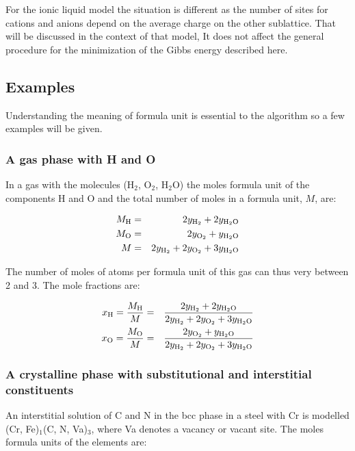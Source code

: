 \documentclass[12pt]{article}
\begin{document}
For the ionic liquid model the situation is different as the number of
sites for cations and anions depend on the average charge on the other
sublattice.  That will be discussed in the context of that model, It
does not affect the general procedure for the minimization of the
Gibbs energy described here.

\subsection{Examples}

Understanding the meaning of formula unit is essential to the
algorithm so a few examples will be given.

\subsubsection{A gas phase with H and O}

In a gas with the molecules (H$_2$, O$_2$, H$_2$O) the moles formula
unit of the components H and O and the total number of moles in a
formula unit, $M$, are:

\begin{eqnarray*}
M_{\rm H} &=& 2y_{\rm H_2} + 2y_{\rm H_2O}\\
M_{\rm O} &=& 2y_{\rm O_2} + y_{\rm H_2O}\\
M &=& 2y_{\rm H_2} + 2y_{\rm O_2} + 3y_{\rm H_2O}
\end{eqnarray*}

The number of moles of atoms per formula unit of this gas can thus
very between 2 and 3.  The mole fractions are:

\begin{eqnarray*}
x_{\rm H} = \frac{M_{\rm H}}{M} &=& \frac{2y_{\rm H_2} + 2y_{\rm H_2O}}
{2y_{\rm H_2} + 2y_{\rm O_2} + 3y_{\rm H_2O}}\\
x_{\rm O} = \frac{M_{\rm O}}{M} &=& \frac{2y_{\rm O_2} + y_{\rm H_2O}}
{2y_{\rm H_2} + 2y_{\rm O_2} + 3y_{\rm H_2O}}
\end{eqnarray*}

\subsubsection{A crystalline phase with substitutional and interstitial
constituents}

An interstitial solution of C and N in the bcc phase in a steel with
Cr is modelled (Cr, Fe)$_1$(C, N, Va)$_3$, where Va denotes a vacancy
or vacant site.  The moles formula units of the elements are:
\end{document}
